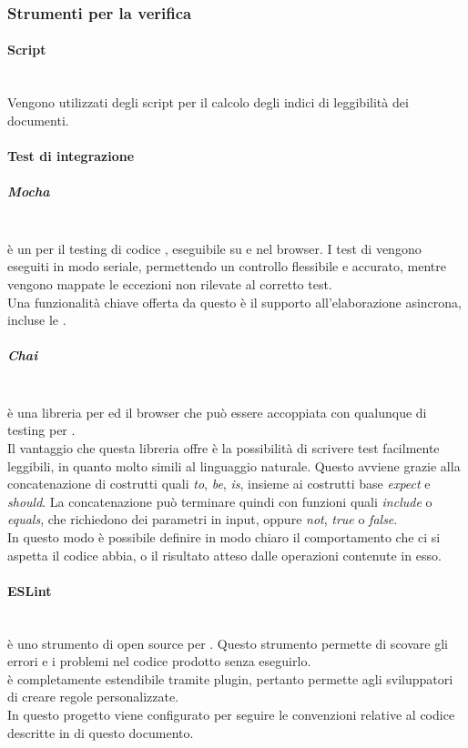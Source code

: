 \subsubsection{Strumenti per la verifica}
\paragraph{Script}\mbox{}\\
Vengono utilizzati degli script per il calcolo degli indici di leggibilità dei documenti.

\paragraph{Test di integrazione}\mbox{}
\subparagraph{Mocha}\mbox{}\\
 è un  per il testing di codice , eseguibile su  e nel browser. I test di  vengono eseguiti in modo seriale, permettendo un controllo flessibile e accurato, mentre vengono mappate le eccezioni non rilevate al corretto test.\\
Una funzionalità chiave offerta da questo  è il supporto all’elaborazione asincrona, incluse le .

\subparagraph{Chai}\mbox{}\\
 è una libreria  per  ed il browser che può essere accoppiata con qualunque  di testing per .\\
Il vantaggio che questa libreria offre è la possibilità di scrivere test facilmente leggibili, in quanto molto simili al linguaggio naturale. Questo avviene grazie alla concatenazione di costrutti quali \textit{to}, \textit{be}, \textit{is}, insieme ai costrutti base \textit{expect} e \textit{should}. La concatenazione può terminare quindi con funzioni quali \textit{include} o \textit{equals}, che richiedono dei parametri in input, oppure \textit{not}, \textit{true} o \textit{false}.\\
In questo modo è possibile definire in modo chiaro il comportamento che ci si aspetta il codice abbia, o il risultato atteso dalle operazioni contenute in esso.

\paragraph{ESLint} \label{sec:eslint}\mbox{}\\
 è uno strumento di  open source per . Questo strumento permette di scovare gli errori e i problemi nel codice prodotto senza eseguirlo.\\  è completamente estendibile tramite plugin, pertanto permette agli sviluppatori di creare regole personalizzate.\\
In questo progetto  viene configurato per seguire le convenzioni relative al codice descritte in  di questo documento.
